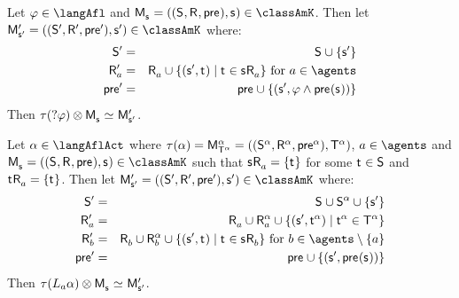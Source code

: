 \begin{lemma}\label{afl-k-construction-test}
Let $\phi \in \langAfl$ and $\aPModel{\aStateS} = \aPModelTuple{\aStateS} \in \classAmK$.
Then let $\aPModel[\prime]{\aStateS[\prime]} = \aPModelTuple[\prime]{\aStateS[\prime]} \in \classAmK$ where:
\begin{eqnarray*}
    \aStates[\prime] &=& \aStates \cup \{\aStateS[\prime]\}\\
    \aAccessibility[\prime]{\agentA} &=& \aAccessibility{\agentA} \cup \{(\aStateS[\prime], \aStateT) \mid \aStateT \in \aStateS \aAccessibility{\agentA}\} \text{ for } \agentA \in \agents\\
    \aPrecondition[\prime] &=& \aPrecondition \cup \{(\aStateS[\prime], \phi \land \aPrecondition(\aStateS))\}
\end{eqnarray*}
Then $\tau(\test{\phi}) \exec \aPModel{\aStateS}  \bisimilar \aPModel[\prime]{\aStateS[\prime]}$.
\end{lemma}

\begin{lemma}\label{afl-k-construction-learning}
Let $\alpha \in \langAflAct$ where $\tau(\alpha) = \aPModel[\alpha]{\aStatesT[\alpha]} = \aPModelTuple[\alpha]{\aStatesT[\alpha]}$, $\agentA \in \agents$ and $\aPModel{\aStateS} = \aPModelTuple{\aStateS} \in \classAmK$ such that $\aStateS \aAccessibility{\agentA} = \{\aStateT\}$ for some $\aStateT \in \aStates$ and $\aStateT \aAccessibility{\agentA} = \{\aStateT\}$.
Then let $\aPModel[\prime]{\aStateS[\prime]} = \aPModelTuple[\prime]{\aStateS[\prime]} \in \classAmK$ where:
\begin{eqnarray*}
    \aStates[\prime] &=& \aStates \cup \aStates[\alpha] \cup \{\aStateS[\prime]\}\\
    \aAccessibility[\prime]{\agentA} &=& \aAccessibility{\agentA} \cup \aAccessibility[\alpha]{\agentA} \cup \{(\aStateS[\prime], \aStateT[\alpha]) \mid \aStateT[\alpha] \in \aStatesT[\alpha]\}\\
    \aAccessibility[\prime]{\agentB} &=& \aAccessibility{\agentB} \cup \aAccessibility[\alpha]{\agentB} \cup \{(\aStateS[\prime], \aStateT) \mid \aStateT \in \aStateS \aAccessibility{\agentB}\} \text{ for } \agentB \in \agents \setminus \{\agentA\}\\
    \aPrecondition[\prime] &=& \aPrecondition \cup \{(\aStateS[\prime], \aPrecondition(\aStateS))\}
\end{eqnarray*}
Then $\tau(\learns_\agentA \alpha) \exec \aPModel{\aStateS} \bisimilar \aPModel[\prime]{\aStateS[\prime]}$.
\end{lemma}

